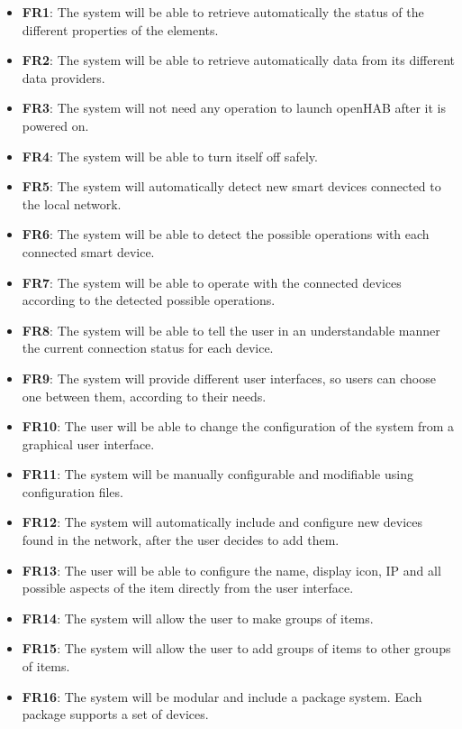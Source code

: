 \begin{itemize}
    \item \textbf{FR1}: The system will be able to retrieve automatically the status of the different properties of the elements.
    \item \textbf{FR2}: The system will be able to retrieve automatically data from its different data providers.
    \item \textbf{FR3}: The system will not need any operation to launch openHAB after it is powered on.
    \item \textbf{FR4}: The system will be able to turn itself off safely.
    \item \textbf{FR5}: The system will automatically detect new smart devices connected to the local network.
    \item \textbf{FR6}: The system will be able to detect the possible operations with each connected smart device. 
    \item \textbf{FR7}: The system will be able to operate with the connected devices according to the detected possible operations.
    \item \textbf{FR8}: The system will be able to tell the user in an understandable manner the current connection status for each
    device.
    \item \textbf{FR9}: The system will provide different user interfaces, so users can choose one between them, according to
    their needs.
    \item \textbf{FR10}: The user will be able to change the configuration of the system from a graphical user interface.
    \item \textbf{FR11}: The system will be manually configurable and modifiable using configuration files.
    \item \textbf{FR12}: The system will automatically include and configure new devices found in the network, after the user decides
    to add them.
    \item \textbf{FR13}: The user will be able to configure the name, display icon, IP and all possible aspects of the item directly from
    the user interface.
    \item \textbf{FR14}: The system will allow the user to make groups of items.
    \item \textbf{FR15}: The system will allow the user to add groups of items to other groups of items.
    \item \textbf{FR16}: The system will be modular and include a package system. Each package supports a set of devices.

\end{itemize}
